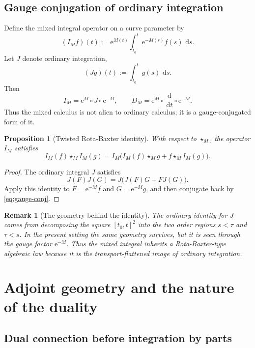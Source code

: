 \documentclass[11pt]{article}
\newtheorem{proposition}{Proposition}
\newtheorem{remark}{Remark}
\newcommand{\dd}{\,\mathrm{d}}
\newcommand{\ee}{\mathrm{e}}
\begin{document}
\subsection{Gauge conjugation of ordinary integration}

Define the mixed integral operator on a curve parameter by
\begin{equation}
\label{eq:IM-def}
(I_Mf)(t):=\ee^{M(t)}\int_{t_0}^t \ee^{-M(s)}f(s)\,\dd s.
\end{equation}
Let $J$ denote ordinary integration,
\[
(Jg)(t):=\int_{t_0}^t g(s)\,\dd s.
\]
Then
\begin{equation}
\label{eq:gauge-conj}
I_M=\ee^M\circ J\circ \ee^{-M},
\qquad
D_M=\ee^M\circ \frac{\dd}{\dd t}\circ \ee^{-M}.
\end{equation}
Thus the mixed calculus is not alien to ordinary calculus; it is a gauge-conjugated form of it.

\begin{proposition}[Twisted Rota-Baxter identity]
\label{prop:twisted-rb}
With respect to $\star_M$, the operator $I_M$ satisfies
\begin{equation}
\label{eq:twisted-rb}
I_M(f)\star_M I_M(g)
=
I_M\bigl(I_M(f)\star_M g+f\star_M I_M(g)\bigr).
\end{equation}
\end{proposition}

\begin{proof}
The ordinary integral $J$ satisfies
\[
J(F)J(G)=J\bigl(J(F)G+FJ(G)\bigr).
\]
Apply this identity to $F=\ee^{-M}f$ and $G=\ee^{-M}g$, and then conjugate back by \eqref{eq:gauge-conj}.
\end{proof}

\begin{remark}[The geometry behind the identity]
The ordinary identity for $J$ comes from decomposing the square $[t_0,t]^2$ into the two order regions $s<\tau$ and $\tau<s$. In the present setting the same geometry survives, but it is seen through the gauge factor $\ee^{-M}$. Thus the mixed integral inherits a Rota-Baxter-type algebraic law because it is the transport-flattened image of ordinary integration.
\end{remark}

\section{Adjoint geometry and the nature of the duality}

\subsection{Dual connection before integration by parts}
\end{document}
